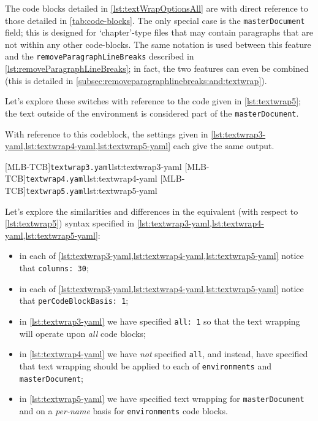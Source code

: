 	The code blocks detailed in \cref{lst:textWrapOptionsAll} are with direct reference to
	those detailed in \vref{tab:code-blocks}. The only special case is the
	\texttt{masterDocument} field; this is designed for `chapter'-type files that may
	contain paragraphs that are not within any other code-blocks. The same notation is used
	between this feature and the \texttt{removeParagraphLineBreaks} described in
	\vref{lst:removeParagraphLineBreaks}; in fact, the two features can even be combined (this is
	detailed in \vref{subsec:removeparagraphlinebreaks:and:textwrap}).

	Let's explore these switches with reference to the code given in
	\cref{lst:textwrap5}; the text outside of the environment is considered part of
	the \texttt{masterDocument}.

	\begin{widepage}
	\end{widepage}

	With reference to this codeblock, the settings given in \cref{lst:textwrap3-yaml,lst:textwrap4-yaml,lst:textwrap5-yaml} each
	give the same output.

	\begin{cmhtcbraster}[raster columns=3,
			raster left skip=-3.5cm,
			raster right skip=-2cm,
			raster column skip=.03\linewidth]
		[MLB-TCB]{\texttt{textwrap3.yaml}}{lst:textwrap3-yaml}
		[MLB-TCB]{\texttt{textwrap4.yaml}}{lst:textwrap4-yaml}
		[MLB-TCB]{\texttt{textwrap5.yaml}}{lst:textwrap5-yaml}
	\end{cmhtcbraster}

	Let's explore the similarities and differences in the equivalent (with respect to
	\cref{lst:textwrap5}) syntax specified in \cref{lst:textwrap3-yaml,lst:textwrap4-yaml,lst:textwrap5-yaml}:
	\begin{itemize}
		\item in each of \cref{lst:textwrap3-yaml,lst:textwrap4-yaml,lst:textwrap5-yaml} notice that \texttt{columns: 30};
		\item in each of \cref{lst:textwrap3-yaml,lst:textwrap4-yaml,lst:textwrap5-yaml} notice that \texttt{perCodeBlockBasis: 1};
		\item in \cref{lst:textwrap3-yaml} we have specified \texttt{all: 1} so that the
		      text wrapping will operate upon \emph{all} code blocks;
		\item in \cref{lst:textwrap4-yaml} we have \emph{not} specified
		      \texttt{all}, and instead, have specified that text wrapping should be
		      applied to each of \texttt{environments} and \texttt{masterDocument};
		\item in \cref{lst:textwrap5-yaml} we have specified text wrapping for
		      \texttt{masterDocument} and on a \emph{per-name} basis for
		      \texttt{environments} code blocks.
	\end{itemize}


